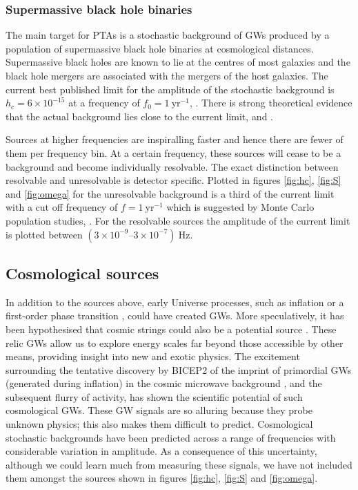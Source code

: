 \subsubsection{Supermassive black hole binaries}
The main target for PTAs is a stochastic background of GWs produced by a population of supermassive black hole binaries at cosmological distances. Supermassive black holes are known to lie at the centres of most galaxies and the black hole mergers are associated with the mergers of the host galaxies. The current best published limit for the amplitude of the stochastic background is $h_{c} = 6\times 10^{-15}$ at a frequency of $f_{0}=1~\mathrm{yr}^{-1}$, \cite{Haasteren}. There is strong theoretical evidence that the actual background lies close to the current limit, \cite{imminentdetectionofgravitationalwaves} and \cite{Sesana-2012}. 

Sources at higher frequencies are inspiralling faster and hence there are fewer of them per frequency bin. At a certain frequency, these sources will cease to be a background and become individually resolvable. The exact distinction between resolvable and unresolvable is detector specific. Plotted in figures \ref{fig:hc}, \ref{fig:S} and \ref{fig:omega} for the unresolvable background is a third of the current limit with a cut off frequency of $f=1~\mathrm{yr}^{-1}$ which is suggested by Monte Carlo population studies, \cite{SesanaVecchioColancino}. For the resolvable sources the amplitude of the current limit is plotted between $\left(3\times 10^{-9}\right.$--$\left.3\times 10^{-7}\right)~\mathrm{Hz}$.




\subsection{Cosmological sources}

In addition to the sources above, early Universe processes, such as inflation \citep{Grishchuk2005} or a first-order phase transition \citep{Binetruy2012}, could have created GWs. More speculatively, it has been hypothesised that cosmic strings could also be a potential source \citep{Damour2005,Binetruy2012}. These relic GWs allow us to explore energy scales far beyond those accessible by other means, providing insight into new and exotic physics. The excitement surrounding the tentative discovery by BICEP2 of the imprint of primordial GWs (generated during inflation) in the cosmic microwave background \citep{Ade2014}, and the subsequent flurry of activity, has shown the scientific potential of such cosmological GWs. These GW signals are so alluring because they probe unknown physics; this also makes them difficult to predict. Cosmological stochastic backgrounds have been predicted across a range of frequencies with considerable variation in amplitude. As a consequence of this uncertainty, although we could learn much from measuring these signals, we have not included them amongst the sources shown in figures \ref{fig:hc}, \ref{fig:S} and \ref{fig:omega}.


